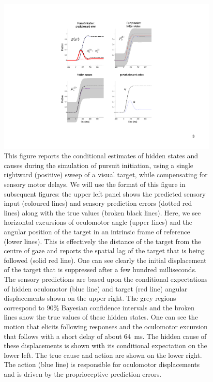 \documentclass[a4paper]{article} %
\newcommand{\ms}{\si{\milli\second}}%
\begin{document}
\begin{figure}%
 \centerline{%
 \includegraphics[width=.95\columnwidth, clip, trim = 7cm 3cm 7cm 2cm]{Figure3.pdf}
 }%
\caption{This figure reports the conditional estimates of
hidden states and causes during the simulation of pursuit initiation,
using a single rightward (positive) sweep of a visual target, while
compensating for sensory motor delays. We will use the format of this
figure in subsequent figures: the upper left panel shows the predicted
sensory input (coloured lines) and sensory prediction errors (dotted red
lines) along with the true values (broken black lines). Here, we see
horizontal excursions of oculomotor angle (upper lines) and the angular
position of the target in an intrinsic frame of reference (lower lines).
This is effectively the distance of the target from the centre of gaze
and reports the spatial lag of the target that is being followed (solid
red line). One can see clearly the initial displacement of the target
that is suppressed after a few hundred milliseconds. The sensory
predictions are based upon the conditional expectations of hidden
oculomotor (blue line) and target (red line) angular displacements shown
on the upper right. The grey regions correspond to 90\% Bayesian
confidence intervals and the broken lines show the true values of these
hidden states. One can see the motion that elicits following responses
and the oculomotor excursion that follows with a short delay of about 64~\ms . The hidden cause of these displacements is shown with its
conditional expectation on the lower left. The true cause and action are
shown on the lower right. The action (blue line) is responsible for
oculomotor displacements and is driven by the proprioceptive prediction
errors.}%
\label{fig:figure3}
\end{figure}
\end{document}

